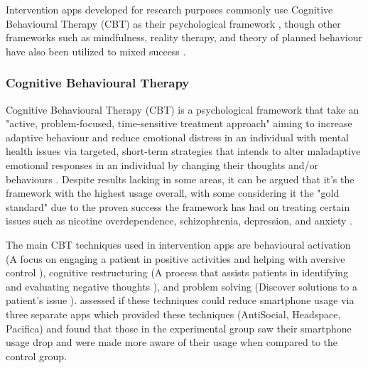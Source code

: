 \documentclass[12pt]{article}
\begin{document}
Intervention apps developed for research purposes commonly use Cognitive Behavioural Therapy (CBT) as their 
psychological framework
\autocite{RefWorks:RefID:87-weisel2019standalone,RefWorks:RefID:75-oliveira2021effectiveness}, though other 
frameworks such as mindfulness, reality therapy, and theory of planned behaviour have also been utilized to 
mixed success 
\autocite{RefWorks:RefID:135-gajecki2014mobile, RefWorks:RefID:136-witkiewitz2014development, RefWorks:RefID:106-lu2025interventions}.

\subsubsection{Cognitive Behavioural Therapy}
Cognitive Behavioural Therapy (CBT) is a psychological framework that take an "active, problem-focused, 
time-sensitive treatment approach" aiming to increase adaptive 
behaviour and reduce emotional distress in an individual with mental health issues via targeted, short-term 
strategies that intends to alter maladaptive emotional responses in an individual by changing their thoughts and/or 
behaviours \autocite{RefWorks:RefID:138-wenzel2017basic,RefWorks:RefID:139-kaczkurkin2015cognitivebehavioral}.
Despite results lacking in some areas, it can be argued that it's the framework with the highest usage 
\autocite{RefWorks:RefID:140-hofmann2012efficacy} overall, with some considering it the "gold 
standard" \autocite{RefWorks:RefID:141-beck2020cognitive} due to the proven success the framework has had on 
treating certain issues such as nicotine overdependence, schizophrenia, 
depression, and anxiety \autocite{RefWorks:RefID:140-hofmann2012efficacy}. \newline

The main CBT techniques used in intervention apps are behavioural activation (A focus on engaging
a patient in positive activities and helping with aversive control 
\autocite{RefWorks:RefID:146-tindall2017behavioural}), cognitive restructuring (A process that assists patients 
in identifying and evaluating negative thoughts \autocite{RefWorks:RefID:138-wenzel2017basic}), and problem solving 
(Discover solutions to a patient's issue \autocite{RefWorks:RefID:144-denecke2022implementation}). 
\textcite{RefWorks:RefID:147-throuvala2020mind} assessed if these techniques could reduce smartphone 
usage via three separate apps which provided these techniques (AntiSocial, Headspace, Pacifica) and found that 
those in the experimental group saw their smartphone usage drop and were made more aware of their usage when 
compared to the control group.
\end{document}
